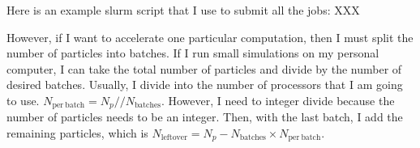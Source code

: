             
            Here is an example slurm script that I use to submit all the jobs: XXX
            
            However, if I want to accelerate one particular computation, then I must split the number of particles into batches. If I run small simulations on my personal computer, I can take the total number of particles and divide by the number of desired batches. Usually, I divide into the number of processors that I am going to use. $N_\mathrm{per~batch}=N_p//N_\mathrm{batches}$. However, I need to integer divide because the number of particles needs to be an integer. Then, with the last batch, I add the remaining particles, which is $N_\mathrm{left over} = N_p - N_\mathrm{batches} \times N_\mathrm{per~batch}$. 



